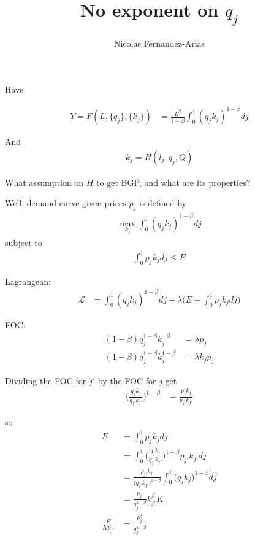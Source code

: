 \documentclass[12pt,english]{article}
\theoremstyle{remark}
\begin{document}
	
\title{No exponent on $q_j$}
\author{Nicolas Fernandez-Arias}
\maketitle

Have

\begin{align*}
Y = F(L,\{q_j\},\{k_j\}) &= \frac{L^{\beta}}{1-\beta} \int_0^1 (q_j k_j)^{1-\beta} dj
\end{align*}

And
\begin{align*}
k_j = H(l_j,q_j,Q)
\end{align*}

What assumption on $H$ to get BGP, and what are its properties?

Well, demand curve given prices $p_j$ is defined by 
\begin{align*}
	\max_{k_j} \int_0^1 (q_j k_j)^{1-\beta} dj 
\end{align*}
subject to 
\begin{align*}
	\int_0^1 p_j k_j dj \le E
\end{align*}

Lagrangean:
\begin{align*}
	\mathcal{L} &= \int_0^1 (q_j k_j)^{1-\beta} dj  + \lambda \big(E -\int_0^1 p_j k_j dj  \big)
\end{align*}

FOC:
\begin{align*}
	(1-\beta) q_j^{1-\beta} k_j^{-\beta} &= \lambda p_j \\
	(1-\beta) q_j^{1-\beta} k_j^{1-\beta} &= \lambda k_j p_j
\end{align*}

Dividing the FOC for $j'$ by the FOC for $j$ get
\begin{align*}
	\Big (\frac{q_j k_j}{q_{j'} k_{j'}} \Big)^{1-\beta} &= \frac{p_j k_j}{p_{j'} k_{j'}}
\end{align*}

so 
\begin{align*}
	E &= \int_0^1 p_j k_j dj \\
	  &= \int_0^1 \Big (\frac{q_j k_j}{q_{j'} k_{j'}} \Big)^{1-\beta} p_{j'} k_{j'} dj \\
	  &= \frac{p_{j'} k_{j'}}{\big(q_{j'} k_{j'}\big)^{1-\beta}} \int_0^1 \big( {q_j} {k_j} \big)^{1-\beta}  dj \\
	  &= \frac{p_{j'}}{q_{j'}^{1-\beta}} k_{j'}^{\beta} K \\
	\frac{E}{K p_{j'}} &= \frac{k_{j'}^{\beta}}{q_{j'}^{1-\beta}} 
\end{align*}
\end{document}
